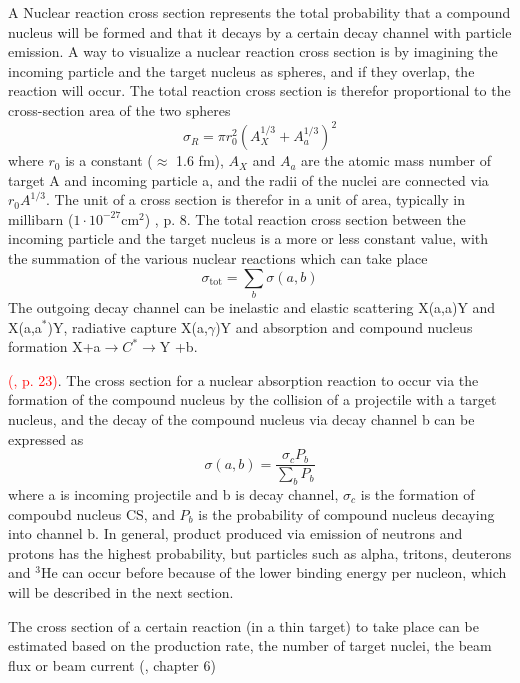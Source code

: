 A Nuclear reaction cross section represents the total probability that a compound nucleus will be formed and that it decays by a certain decay channel with particle emission. A way to visualize a nuclear reaction cross section is by imagining the incoming particle and the target nucleus as spheres, and if they overlap, the reaction will occur. The total reaction cross section is therefor proportional to the cross-section area of the two spheres
\begin{equation}
    \sigma_R = \pi r_0^2 (A_X^{1/3} + A_a^{1/3})^2
\end{equation}
where $r_0$ is a constant ($\approx$ 1.6 fm), $A_X$ and $A_a$ are the atomic mass number of target A and incoming particle a, and the radii of the nuclei are connected via $r_0A^{1/3}$. The unit of a cross section is therefor in a unit of area, typically in millibarn ($1\cdot 10^{-27}$cm$^2$) \cite{IAEA2009}, p. 8. The total reaction cross section between the incoming particle and the target nucleus is a more or less constant value, with the summation of the various nuclear reactions which can take place
\begin{equation}
    \sigma_\text{tot} = \sum_b \sigma(a,b)
\end{equation}
The outgoing decay channel can be inelastic and elastic scattering X(a,a)Y and X(a,a$^*$)Y, radiative capture X(a,$\gamma$)Y and absorption and compound nucleus formation X+a$\rightarrow C^* \rightarrow$Y +b.   

\textcolor{red}{(\cite{international2012iaea}, p. 23)}. The cross section for a nuclear absorption reaction to occur via the formation of the compound nucleus by the collision of a projectile with a target nucleus, and the decay of the compound nucleus via decay channel b can be expressed as
\begin{equation}
    \sigma(a,b)=\frac{\sigma_c P_b}{\sum_b P_b}
\end{equation}
where a is incoming projectile and b is decay channel, $\sigma_c$ is the formation of compoubd nucleus CS, and $P_b$ is the probability of compound nucleus decaying into channel b. In general, product produced via emission of neutrons and protons has the highest probability, but particles such as alpha, tritons, deuterons and $^3$He can occur before because of the lower binding energy per nucleon, which will be described in the next section. 


The cross section of a certain reaction (in a thin target) to take place can be estimated based on the production rate, the number of target nuclei, the beam flux or beam current (\cite{KraneKennethS.Halliday1987}, chapter 6)


